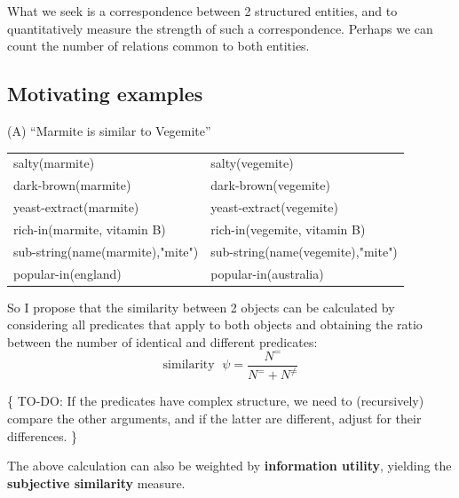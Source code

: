 What we seek is a correspondence between 2 structured entities, and to quantitatively measure the strength of such a correspondence.  Perhaps we can count the number of relations common to both entities.

\subsection{Motivating examples}

(A) ``Marmite is similar to Vegemite''\\
\hspace*{1cm} \begin{tabular}{l|l}
salty(marmite)                   & salty(vegemite)\\
dark-brown(marmite)              & dark-brown(vegemite)\\
yeast-extract(marmite)           & yeast-extract(vegemite)\\
rich-in(marmite, vitamin B)      & rich-in(vegemite, vitamin B)\\
sub-string(name(marmite),"mite") & sub-string(name(vegemite),"mite")\\
popular-in(england)              & popular-in(australia)
\end{tabular}

So I propose that the similarity between 2 objects can be calculated by considering all predicates that apply to both objects and obtaining the ratio between the number of identical and different predicates:
\begin{equation}
\mbox{similarity } \; \psi = \frac{N^{=}}{N^{=} + N^{\neq}}
\end{equation}

\{ TO-DO:  If the predicates have complex structure, we need to (recursively) compare the other arguments, and if the latter are different, adjust for their differences. \}

The above calculation can also be weighted by \textbf{information utility}, yielding the \textbf{subjective similarity} measure.


